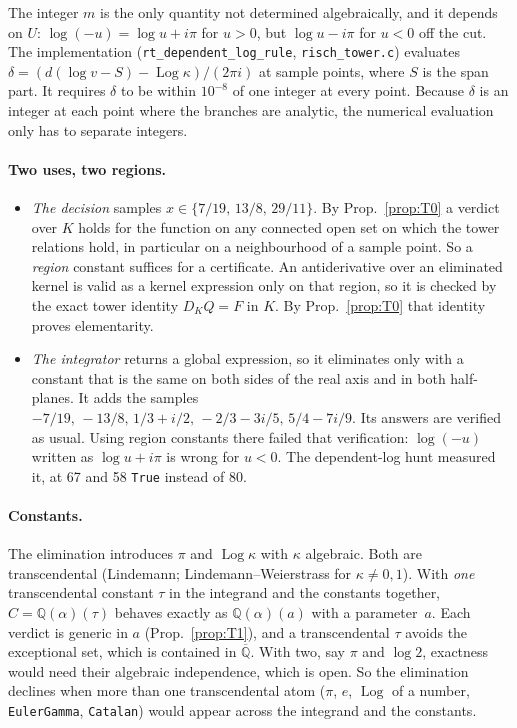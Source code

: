 \documentclass[11pt]{article}
\theoremstyle{definition}
\theoremstyle{remark}
\newcommand{\Q}{\mathbb{Q}}
\newcommand{\Qbar}{\overline{\mathbb{Q}}}
\newcommand{\code}[1]{\texttt{#1}}
\begin{document}
The integer $m$ is the only quantity not determined algebraically, and it depends on
$U$: $\log(-u)=\log u+i\pi$ for $u>0$, but $\log u-i\pi$ for $u<0$ off the cut. The
implementation (\code{rt\_dependent\_log\_rule}, \code{risch\_tower.c}) evaluates
$\delta=(d(\log v-S)-\operatorname{Log}\kappa)/(2\pi i)$ at sample points, where $S$
is the span part. It requires $\delta$ to be within $10^{-8}$ of one integer at every
point. Because $\delta$ is an integer at each point where the branches are analytic,
the numerical evaluation only has to separate integers.

\paragraph{Two uses, two regions.}
\begin{itemize}
\item \emph{The decision} samples $x\in\{7/19,\,13/8,\,29/11\}$. By Prop.~\ref{prop:T0}
  a verdict over $K$ holds for the function on any connected open set on which the tower
  relations hold, in particular on a neighbourhood of a sample point. So a
  \emph{region} constant suffices for a certificate. An antiderivative over an eliminated
  kernel is valid as a kernel expression only on that region, so it is checked by the
  exact tower identity $D_KQ=F$ in $K$. By Prop.~\ref{prop:T0} that identity proves
  elementarity.
\item \emph{The integrator} returns a global expression, so it eliminates only with a
  constant that is the same on both sides of the real axis and in both half-planes. It
  adds the samples $-7/19,\,-13/8,\,1/3+i/2,\,-2/3-3i/5,\,5/4-7i/9$. Its answers are
  verified as usual. Using region constants there failed that verification:
  $\log(-u)$ written as $\log u+i\pi$ is wrong for $u<0$. The dependent-log hunt
  measured it, at 67 and 58 \code{True} instead of 80.
\end{itemize}

\paragraph{Constants.} The elimination introduces $\pi$ and $\operatorname{Log}\kappa$
with $\kappa$ algebraic. Both are transcendental (Lindemann; Lindemann--Weierstrass for
$\kappa\ne0,1$). With \emph{one} transcendental constant $\tau$ in the integrand and the
constants together, $C=\Q(\alpha)(\tau)$ behaves exactly as $\Q(\alpha)(a)$ with a
parameter~$a$. Each verdict is generic in $a$ (Prop.~\ref{prop:T1}), and a transcendental
$\tau$ avoids the exceptional set, which is contained in $\Qbar$. With two, say $\pi$ and
$\log2$, exactness would need their algebraic independence, which is open. So the
elimination declines when more than one transcendental atom ($\pi$, $e$,
$\operatorname{Log}$ of a number, \code{EulerGamma}, \code{Catalan}) would appear across
the integrand and the constants.
\end{document}
